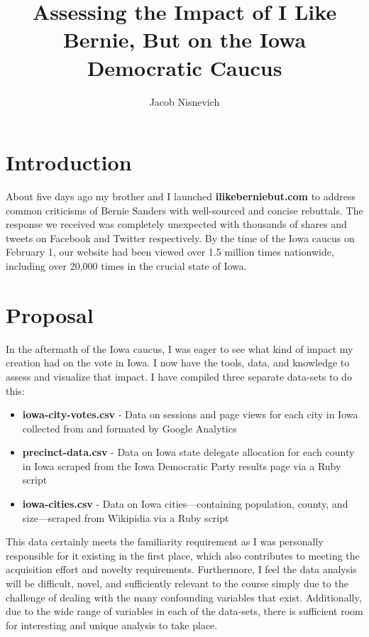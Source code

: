 \documentclass{article}
\begin{document}
\title{Assessing the Impact of \textbf{I Like Bernie, But} on the Iowa Democratic Caucus}
\author{Jacob Nisnevich}

\maketitle

\section*{Introduction}

About five days ago my brother and I launched \textbf{ilikeberniebut.com} to address common criticisms of Bernie Sanders with well-sourced and concise rebuttals. The response we received was completely unexpected with thousands of shares and tweets on Facebook and Twitter respectively. By the time of the Iowa caucus on February 1, our website had been viewed over 1.5 million times nationwide, including over 20,000 times in the crucial state of Iowa.

\section*{Proposal}

In the aftermath of the Iowa caucus, I was eager to see what kind of impact my creation had on the vote in Iowa. I now have the tools, data, and knowledge to assess and visualize that impact. I have compiled three separate data-sets to do this:

\begin{itemize}
	\item \textbf{iowa-city-votes.csv} - Data on sessions and page views for each city in Iowa collected from and formated by Google Analytics
	\item \textbf{precinct-data.csv} - Data on Iowa state delegate allocation for each county in Iowa scraped from the Iowa Democratic Party results page via a Ruby script
	\item \textbf{iowa-cities.csv} - Data on Iowa cities---containing population, county, and size---scraped from Wikipidia via a Ruby script
\end{itemize}

This data certainly meets the familiarity requirement as I was personally responsible for it existing in the first place, which also contributes to meeting the acquisition effort and novelty requirements. Furthermore, I feel the data analysis will be difficult, novel, and sufficiently relevant to the course simply due to the challenge of dealing with the many confounding variables that exist. Additionally, due to the wide range of variables in each of the data-sets, there is sufficient room for interesting and unique analysis to take place.
\end{document}
